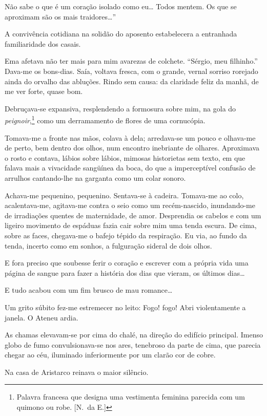 Não sabe o que é um coração isolado como eu\ldots
Todos mentem. Os que se aproximam são os mais traidores\ldots'' 

A convivência cotidiana na solidão do aposento estabelecera a entranhada
familiaridade dos casais. 

Ema afetava não ter mais para mim avarezas de
colchete. ``Sérgio, meu filhinho.'' Dava{}-me os bons{}-dias. Saía, voltava
fresca, com o grande, vernal sorriso rorejado ainda do orvalho das
abluções. Rindo sem causa: da claridade feliz da manhã, de me ver
forte, quase bom. 

Debruçava{}-se expansiva, resplendendo a formosura
sobre mim, na gola do \textit{peignoir},\footnote{ Palavra francesa que 
designa uma vestimenta feminina parecida com um quimono ou robe. [N.~da E.]} 
como um derramamento de flores de uma cornucópia. 

Tomava{}-me a fronte nas mãos, colava à dela; arredava{}-se
um pouco e olhava{}-me de perto, bem dentro dos olhos, num encontro
inebriante de olhares. Aproximava o rosto e contava, lábios sobre
lábios, mimosas historietas sem texto, em que falava mais a vivacidade
sangüínea da boca, do que a imperceptível confusão de arrulhos
cantando{}-lhe na garganta como um colar sonoro. 

Achava{}-me pequenino,
pequenino. Sentava{}-se à cadeira. Tomava{}-me ao colo,
acalentava{}-me, agitava{}-me contra o seio como um recém{}-nascido,
inundando{}-me de irradiações quentes de maternidade, de amor.
Desprendia os cabelos e com um ligeiro movimento de espáduas fazia cair
sobre mim uma tenda escura. De cima, sobre as faces, chegava{}-me o
bafejo tépido da respiração. Eu via, ao fundo da tenda, incerto como em
sonhos, a fulguração sideral de dois olhos. 

E fora preciso que soubesse
ferir o coração e escrever com a própria vida uma página de sangue para
fazer a história dos dias que vieram, os últimos dias\ldots 

E tudo acabou com um fim brusco de mau romance\ldots 

Um grito súbito 
fez{}-me estremecer no leito: Fogo! fogo! Abri violentamente a janela. 
O Ateneu ardia. 

As chamas elevavam{}-se por cima do 
chalé, na direção do edifício
principal. Imenso globo de fumo convulsionava{}-se nos ares, tenebroso
da parte de cima, que parecia chegar ao céu, iluminado inferiormente
por um clarão cor de cobre. 

Na casa de Aristarco reinava o maior silêncio. 

